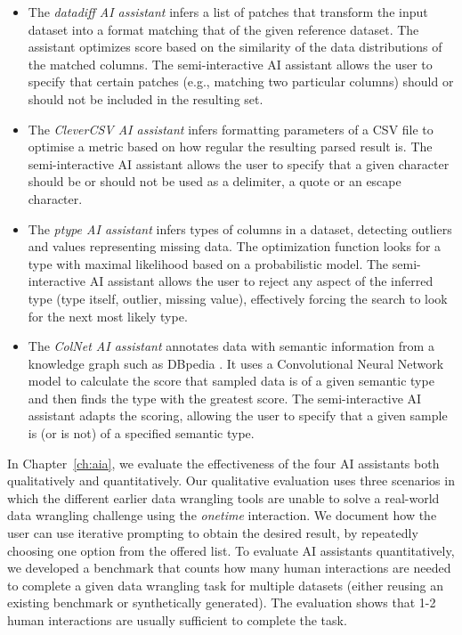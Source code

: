 \documentclass[fleqn,11pt]{report}
\theoremstyle{definition}
\newenvironment{nitemize}
{ \vspace{-0.4em}
  \begin{itemize}
    \setlength{\itemsep}{5pt}
    \setlength{\parskip}{0pt}
    \setlength{\parsep}{0pt} }
{ \end{itemize}
  \vspace{-0.4em} }
\begin{document}
\begin{nitemize}
\item The \emph{datadiff AI assistant} infers a list of patches that transform the input dataset
  into a format matching that of the given reference dataset. The assistant optimizes score based
  on the similarity of the data distributions of the matched columns. The semi-interactive AI
  assistant allows the user to specify that certain patches (e.g., matching two particular columns)
  should or should not be included in the resulting set.

\item The \emph{CleverCSV AI assistant} infers formatting parameters of a CSV file to optimise a
  metric based on how regular the resulting parsed result is. The semi-interactive AI assistant
  allows the user to specify that a given character should be or should not be used as a delimiter,
  a quote or an escape character.

\item The \emph{ptype AI assistant} infers types of columns in a dataset, detecting outliers and
  values representing missing data. The optimization function looks for a type with maximal
  likelihood based on a probabilistic model. The semi-interactive AI assistant allows the user
  to reject any aspect of the inferred type (type itself, outlier, missing value), effectively
  forcing the search to look for the next most likely type.

\item The \emph{ColNet AI assistant} annotates data with semantic information from a knowledge
  graph such as DBpedia \citep{lehmann-2015-dbpedia}. It uses a Convolutional Neural Network model
  to calculate the score that sampled data is of a given semantic type and then finds the type
  with the greatest score. The semi-interactive AI assistant adapts the scoring, allowing the
  user to specify that a given sample is (or is not) of a specified semantic type.
\end{nitemize}

In Chapter~\ref{ch:aia}, we evaluate the effectiveness of the four AI assistants both qualitatively
and quantitatively. Our qualitative evaluation uses three scenarios in which the different
earlier data wrangling tools are unable to solve a real-world data wrangling challenge using
the \emph{onetime} interaction. We document how the user can use iterative prompting to obtain
the desired result, by repeatedly choosing one option from the offered list. To evaluate
AI assistants quantitatively, we developed a benchmark that counts how many human interactions
are needed to complete a given data wrangling task for multiple datasets (either reusing an
existing benchmark or synthetically generated). The evaluation shows that 1-2 human interactions
are usually sufficient to complete the task.
\end{document}
